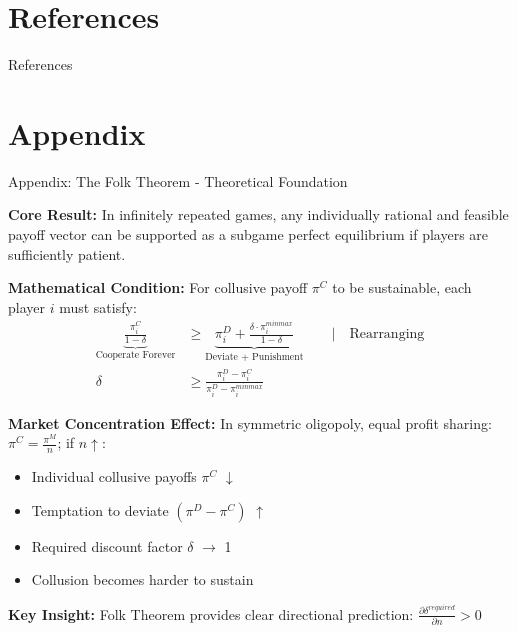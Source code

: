 \documentclass[10pt, aspectratio=169]{beamer}
\begin{document}
\section{References}
\begin{frame}[allowframebreaks]{References}
    \printbibliography[heading=none]
\end{frame}


\appendix

\section{Appendix}

\begin{frame}{Appendix: The Folk Theorem - Theoretical Foundation}

    \textbf{Core Result:} In infinitely repeated games, any individually rational and feasible payoff vector can be supported as a subgame perfect equilibrium if players are sufficiently patient.
    
    \textbf{Mathematical Condition:}
    For collusive payoff $\pi^C$ to be sustainable, each player $i$ must satisfy:
    \begin{align*}
        \underbrace{\frac{\pi_i^C}{1-\delta}}_{\text{Cooperate Forever}} &\geq \underbrace{\pi_i^D + \frac{\delta \cdot \pi_i^{minmax}}{1-\delta}}_{\text{Deviate + Punishment}} \quad\quad \vert \quad\text{Rearranging} \\
        \delta &\geq \frac{\pi_i^D - \pi_i^C}{\pi_i^D - \pi_i^{minmax}}
    \end{align*}
    
    \textbf{Market Concentration Effect:}
    In symmetric oligopoly, equal profit sharing: $\pi^C = \frac{\pi^M}{n}$; if $n\uparrow$:
    \begin{multicols}{2}
        \begin{itemize}
            \item Individual collusive payoffs $\pi^C$ $\downarrow$
            \item Temptation to deviate $(\pi^D - \pi^C)$ $\uparrow$ 
            \item Required discount factor $\delta$ $\rightarrow$ 1
            \item Collusion becomes harder to sustain
        \end{itemize}
    \end{multicols}
    \textbf{Key Insight:}
    Folk Theorem provides clear directional prediction: $\frac{\partial \delta^{required}}{\partial n} > 0$ \hfill\hyperlink{app:researchquestion}{}
\end{frame}
\end{document}
